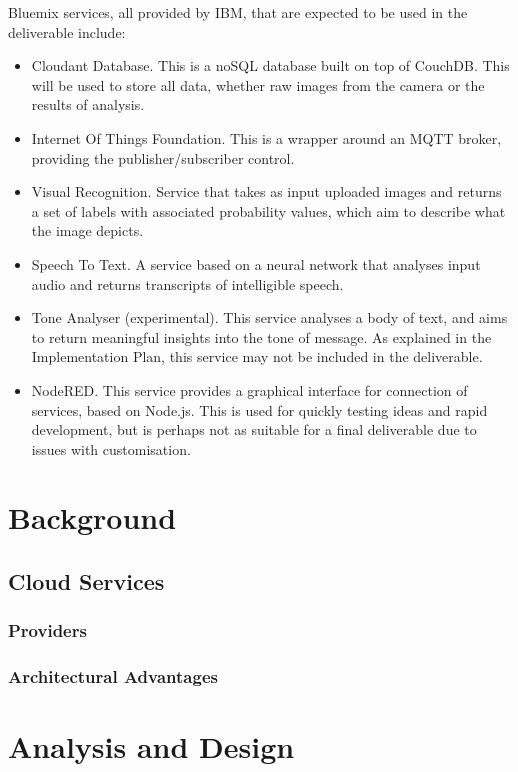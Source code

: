 \documentclass{article}
\begin{document}
\vspace{\baselineskip} \noindent
Bluemix services, all provided by IBM, that are expected to be used in the deliverable include:
\begin{itemize}
    \item Cloudant Database. This is a noSQL database built on top of CouchDB. This will be used to store all data, whether raw images from the camera or the results of analysis.
    \item Internet Of Things Foundation. This is a wrapper around an MQTT broker, providing the publisher/subscriber control.
    \item Visual Recognition. Service that takes as input uploaded images and returns a set of labels with associated probability values, which aim to describe what the image depicts.
    \item Speech To Text. A service based on a neural network that analyses input audio and returns transcripts of intelligible speech.
    \item Tone Analyser (experimental). This service analyses a body of text, and aims to return meaningful insights into the tone of message. As explained in the Implementation Plan, this service may not be included in the deliverable.
    \item NodeRED. This service provides a graphical interface for connection of services, based on Node.js. This is used for quickly testing ideas and rapid development, but is perhaps not as suitable for a final deliverable due to issues with customisation.
\end{itemize}



\section{Background}
\subsection{Cloud Services}
\subsubsection{Providers}
\subsubsection{Architectural Advantages}


\section{Analysis and Design}
\end{document}
